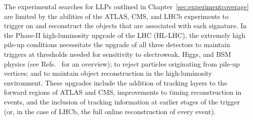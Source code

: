 


\noindent The experimental searches for LLPs outlined in Chapter~\ref{sec:experimentcoverage} are limited by the abilities of the ATLAS, CMS, and LHCb experiments to trigger on and reconstruct the objects that are associated with each signature. In the Phase-II high-luminosity upgrade of the LHC (HL-LHC), the extremely high pile-up conditions necessitate the upgrade of all three detectors to maintain triggers at thresholds needed for sensitivity to electroweak, Higgs, and BSM physics (see
Refs.~\cite{Schmidt:2016jra,Apollinari:2015bam} for an overview); to reject particles originating from pile-up vertices; and to maintain object reconstruction in the high-luminosity environment. These upgrades include the addition of tracking layers to the forward regions of ATLAS and CMS, improvements to timing reconstruction in events, and the inclusion of tracking information at earlier stages of the trigger (or, in the case of LHCb, the full online reconstruction of every event).

